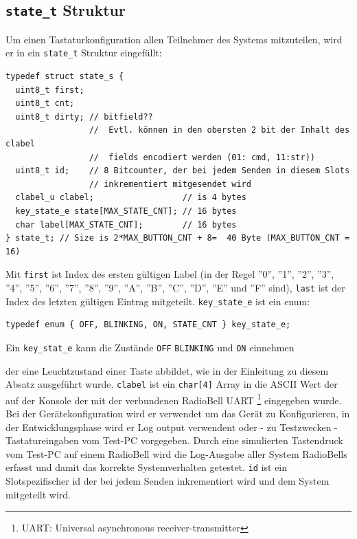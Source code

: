 \subsection{\texttt{state\_t} Struktur}
Um einen Tastaturkonfiguration allen Teilnehmer des Systems mitzuteilen, wird er in ein \verb|state_t| Struktur eingefüllt:
\begin{listing}
\begin{verbatim}
typedef struct state_s {
  uint8_t first;
  uint8_t cnt;
  uint8_t dirty; // bitfield??
                 //  Evtl. können in den obersten 2 bit der Inhalt des clabel
                 //  fields encodiert werden (01: cmd, 11:str))
  uint8_t id;    // 8 Bitcounter, der bei jedem Senden in diesem Slots 
                 // inkrementiert mitgesendet wird
  clabel_u clabel;                  // is 4 bytes
  key_state_e state[MAX_STATE_CNT]; // 16 bytes
  char label[MAX_STATE_CNT];        // 16 bytes
} state_t; // Size is 2*MAX_BUTTON_CNT + 8=  40 Byte (MAX_BUTTON_CNT = 16)
\end{verbatim}
\caption{Definition der \texttt{state\_t} Struktur}
\label{state_t}
\end{listing}
Mit \verb|first| ist Index des ersten gültigen Label (in der Regel ''0'', ''1'', ''2'', ''3'', ''4'', ''5'', ''6'', ''7'', ''8'', ''9'', ''A'', ''B'', ''C'', ''D'', ''E'' und ''F'' sind), \verb|last| ist der Index des letzten gültigen Eintrag mitgeteilt. \verb|key_state_e| ist ein enum:
\begin{listing}
\begin{verbatim}
typedef enum { OFF, BLINKING, ON, STATE_CNT } key_state_e;
\end{verbatim}
Ein \verb|key_stat_e| kann die Zustände \verb|OFF| \verb|BLINKING| und \verb|ON| einnehmen
\caption{Definition der \texttt{key\_state\_e} Struktur}
\label{key_state_e}
\end{listing}
der eine Leuchtzustand einer Taste abbildet, wie in der Einleitung zu diesem Absatz ausgeführt wurde. \verb|clabel| ist ein \verb|char[4]| Array in die ASCII Wert der auf der Konsole der mit der verbundenen RadioBell UART \footnote{UART: Universal asynchronous receiver-transmitter} eingegeben wurde. Bei der Gerätekonfiguration wird er verwendet um das Gerät zu Konfigurieren, in der Entwicklungsphase wird er Log output verwendent oder - zu Testzwecken - Tastatureingaben vom Test-PC vorgegeben. Durch  eine simulierten Tastendruck vom Test-PC auf einem RadioBell wird die Log-Ausgabe aller System RadioBells erfasst und damit das korrekte Systemverhalten getestet. \verb|id| ist ein Slotspezifischer id der bei jedem Senden inkrementiert wird und dem System mitgeteilt wird. 
